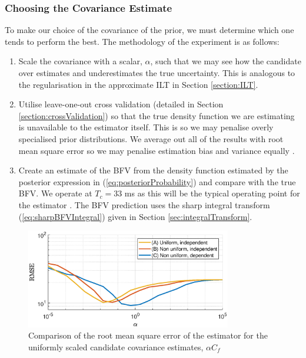 \subsubsection{Choosing the Covariance Estimate}
To make our choice of the covariance of the prior, we must determine which one tends to perform the best. The methodology of the experiment is as follows:
\begin{enumerate}
    \item Scale the covariance with a scalar, $\alpha$, such that we may see how the candidate over estimates and underestimates the true uncertainty. This is analogous to the regularisation in the approximate ILT in Section \ref{section:ILT}.
    \item Utilise leave-one-out cross validation (detailed in Section \ref{section:crossValidation}) so that the true density function we are estimating is unavailable to the estimator itself. This is so we may penalise overly specialised prior distributions. We average out all of the results with root mean square error so we may penalise estimation bias and variance equally \cite{StatisticsTextbookMSE}.
    \item Create an estimate of the BFV from the density function estimated by the posterior expression in (\ref{eq:posteriorProbability}) and compare with the true BFV. We operate at $T_c = 33$ ms as this will be the typical operating point for the estimator \cite{porousMediaT2Relaxation}. The BFV prediction uses the sharp integral transform (\ref{eq:sharpBFVIntegral}) given in Section \ref{sec:integralTransform}.
\end{enumerate}

\begin{figure}[tb!]
    \centering
    \includegraphics[width = 0.8\textwidth]{design/compare_covariance.eps}
    \caption{Comparison of the root mean square error of the estimator for the uniformly scaled candidate covariance estimates, $\alpha C_f$}
    \label{fig:RMSE_covariances}
\end{figure}

